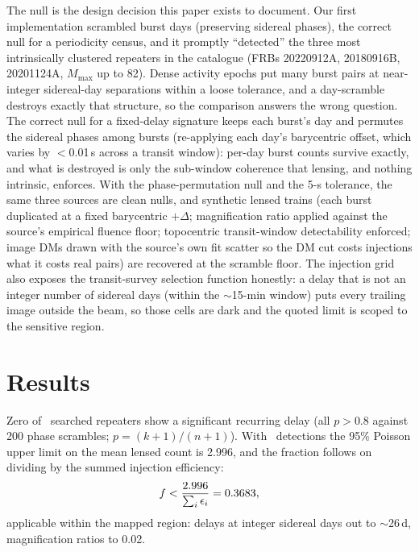 \documentclass[twocolumn]{aastex631}
\begin{document}
The null is the design decision this paper exists to document. Our first implementation
scrambled burst days (preserving sidereal phases), the correct null for a periodicity
census, and it promptly ``detected'' the three most intrinsically clustered repeaters in the
catalogue (FRBs 20220912A, 20180916B, 20201124A, $M_{\max}$ up to 82). Dense activity epochs
put many burst pairs at near-integer sidereal-day separations within a loose tolerance, and a
day-scramble destroys exactly that structure, so the comparison answers the wrong question.
The correct null for a fixed-delay signature keeps each burst's day and permutes the sidereal
phases among bursts (re-applying each day's barycentric offset, which varies by $<$0.01\,s
across a transit window): per-day burst counts survive exactly, and what is destroyed is
only the sub-window coherence that lensing, and nothing intrinsic, enforces. With the
phase-permutation null and the 5-s tolerance, the same three sources are clean nulls, and
synthetic lensed trains (each burst duplicated at a fixed barycentric $+\Delta$; magnification
ratio applied against the source's empirical fluence floor; topocentric transit-window
detectability enforced; image DMs drawn with the source's own fit scatter so the DM cut costs
injections what it costs real pairs) are recovered at the scramble floor. The injection grid
also exposes the transit-survey selection function honestly: a delay that is not an integer
number of sidereal days (within the $\sim$15-min window) puts every trailing image outside
the beam, so those cells are dark and the quoted limit is scoped to the sensitive region.

\section{Results}
Zero of \flRealNSearched\ searched repeaters show a significant recurring delay (all
$p>0.8$ against 200 phase scrambles; $p=(k{+}1)/(n{+}1)$). With \flRealNDet\ detections the 95\% Poisson upper
limit on the mean lensed count is 2.996, and the fraction follows on dividing by the summed
injection efficiency:
\begin{equation}
f < \frac{2.996}{\sum_i \epsilon_i} = 0.3683,
\end{equation}
applicable within the mapped region: delays at integer sidereal days out to $\sim$26\,d,
magnification ratios to 0.02.
\end{document}

